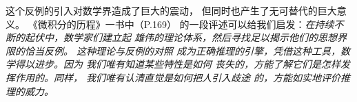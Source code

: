 \begin{shaded}

	这个反例的引入对数学界造成了巨大的震动，
	但同时也产生了无可替代的巨大意义。
	《微积分的历程》一书中（P.169）
	的一段评述可以给我们启发：{\it 在持续不断的起伏中，数学家们建立起
	雄伟的理论体系，然后寻找足以揭示他们的思想界限的恰当反例。
	这种理论与反例的对照
	成为正确推理的引擎，凭借这种工具，数学得以进步。因为{ 我们唯有知道某些特性是如何
	丧失的，方能了解它们是怎样发挥作用的。同样，
	我们唯有认清直觉是如何把人引入歧途
	的，方能如实地评价推理的威力。}}
\end{shaded}


